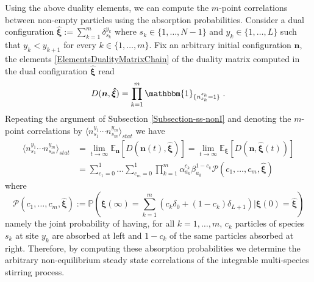 \documentclass[10pt]{article}
\numberwithin{equation}{section}
\numberwithin{equation}{subsection}
\newcommand{\dt}{\;.}
\begin{document}
Using the above duality elements, we can compute the  $m$-point correlations between non-empty particles using the absorption probabilities. Consider a dual configuration $\bm{\hat{\xi}}:=\sum_{k=1}^{m}\delta_{s_{k}}^{y_{k}}$ where $s_{k}\in\{1,\ldots,N-1\}$ and $y_{k}\in\{1,\ldots,L\}$ such that $y_{k}<y_{k+1}$ for every $k\in\{1,\ldots,m\}$. Fix an arbitrary initial configuration $\bm{n}$, the elements \eqref{ElementsDualityMatrixChain} of the duality matrix computed in the dual configuration $\bm{\hat{\xi}}$ read
\begin{equation}
	D(\bm{n},\bm{\hat{\xi}})=\prod_{k=1}^{m}\mathbbm{1}_{\{n_{s_{k}}^{s_{k}}=1\}}\dt
\end{equation}
Repeating the argument of Subsection \ref{Subsection-ss-nonI} and denoting the $m$-point correlations by $\langle n_{s_{1}}^{y_{1}}\cdots n_{s_{m}}^{y_{m}}\rangle_{stat}$ we have 
\begin{equation}\label{CorrelationByABS-prob}
	\begin{split}
	\langle n_{s_{1}}^{y_{1}}\cdots n_{s_{m}}^{y_{m}}\rangle_{stat}&=\lim_{t\to \infty}\mathbb{E}_{\bm{n}}\left[D(\bm{n}(t),\bm{\hat{\xi}})\right]=\lim_{t\to \infty}\mathbb{E}_{\bm{\xi}}\left[D(\bm{n},\bm{\hat{\xi}}(t))\right]
	\\&=\sum_{c_{1}=0}^{1}\ldots \sum_{c_{m}=0}^{1}\prod_{k=1}^{m}\alpha_{a_{k}}^{c_{k}}\beta_{a_{k}}^{1-c_{k}}\mathcal{P}(c_{1},\ldots,c_{m},\hat{\bm{\xi}})
\end{split}
\end{equation}
where
\begin{equation}\label{absProbabilitiesIntegrable}
	\mathcal{P}(c_{1},\ldots,c_{m},\hat{\bm{\xi}}):=\mathbb{P}\left(\bm{\xi}(\infty)=\sum_{k=1}^{m}\left(c_{k}\delta_{0}+(1-c_{k})\delta_{L+1}\right)\lvert \bm{\xi}(0)=\hat{\bm{\xi}}\right)
\end{equation}
 namely the joint probability of having, for all $k=1,\ldots,m$, $c_{k}$ particles of species $s_{k}$ at site $y_{k}$ are absorbed at left and $1-c_{k}$ of the same particles absorbed at right. Therefore, by computing these absorption probabilities we determine the arbitrary non-equilibrium steady state correlations of the integrable multi-species stirring process. 
\end{document}
